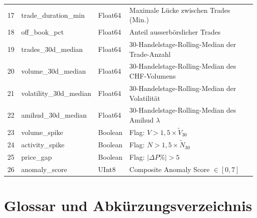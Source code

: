 \documentclass[12pt, a4paper, oneside]{report}
\begin{document}
\begin{longtable}{c >{\ttfamily}l l p{6cm}}
\rowcolor{softgray}
17 & trade\_duration\_min    & Float64  & Maximale L\"ucke zwischen Trades (Min.) \\
18 & off\_book\_pct          & Float64  & Anteil ausserb\"orslicher Trades \\
\rowcolor{softgray}
19 & trades\_30d\_median     & Float64  & 30-Handelstage-Rolling-Median der Trade-Anzahl \\
20 & volume\_30d\_median     & Float64  & 30-Handelstage-Rolling-Median des CHF-Volumens \\
\rowcolor{softgray}
21 & volatility\_30d\_median & Float64  & 30-Handelstage-Rolling-Median der Volatilit\"at \\
22 & amihud\_30d\_median     & Float64  & 30-Handelstage-Rolling-Median des Amihud $\lambda$ \\
\rowcolor{softgray}
23 & volume\_spike          & Boolean  & Flag: $V > 1{,}5 \times \tilde{V}_{30}$ \\
24 & activity\_spike        & Boolean  & Flag: $N > 1{,}5 \times \tilde{N}_{30}$ \\
\rowcolor{softgray}
25 & price\_gap             & Boolean  & Flag: $|\Delta P\%| > 5$ \\
26 & anomaly\_score         & UInt8    & Composite Anomaly Score $\in [0, 7]$ \\
\end{longtable}


\chapter{Glossar und Abk\"urzungsverzeichnis}
\label{app:glossary}
\end{document}
